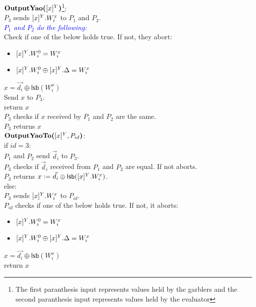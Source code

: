 \begin{protocol}[Output]	
	$\textbf{OutputYao(}[x]^{Y}\textbf{)}$\footnote{The first paranthesis input represents values held by the garblers and the second paranthesis input represents values held by the evaluator}:\\
	\indent $P_3$ sends $[x]^{Y}.W^x_i$ to $P_1$ and $P_2$. \\
	\indent \textcolor{blue}{\textit{$P_1$ and $P_2$ do the following:}} \\
	\indent Check if one of the below holds true. If not, they abort:
	\begin{itemize}[leftmargin=40pt] 
		\item $[x]^{Y}.W^0_i = W^x_i$
		\item $[x]^{Y}.W^0_i \oplus [x]^{Y}.\Delta = W^x_i$
	\end{itemize}
	\indent \indent $x = \vec{d_i} \oplus \mathsf{lsb}(W^x_i)$ \\
	\indent Send $x$ to $P_3$. \\
	\indent return $x$ \\
	\indent $P_3$ checks if $x$ received by $P_1$ and $P_2$ are the same. \\
	\indent $P_3$ returns $x$ \\
	
	\noindent 
	$\textbf{OutputYaoTo(}[x]^{Y}, P_{id}\textbf{)}$:\\
	\indent if $id = 3$: \\
	\indent \indent $P_1$ and $P_2$ send $\vec{d}_{i}$ to $P_3$. \\
	\indent \indent $P_3$ checks if $\vec{d}_i$ received from $P_1$ and $P_2$ are equal. If not aborts. \\
	\indent \indent $P_3$ returns $x := \vec{d}_i \oplus \mathsf{lsb}([x]^{Y}.W^x_i)$. \\
	\indent else: \\
	\indent \indent $P_3$ sends $[x]^{Y}.W^x_i$ to $P_{id}$. \\
	\indent \indent $P_{id}$ checks if one of the below holds true. If not, it aborts:
	\begin{itemize}[leftmargin=55pt] 
		\item $[x]^{Y}.W^0_i = W^x_i$
		\item $[x]^{Y}.W^0_i \oplus [x]^{Y}.\Delta = W^x_i$
	\end{itemize}
	\indent \indent \indent $x = \vec{d_i} \oplus \mathsf{lsb}(W^x_i)$ \\
	\indent \indent return $x$
\end{protocol}
